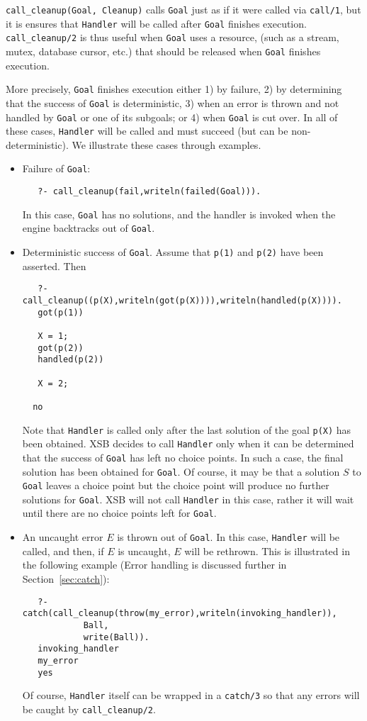 \begin{description}
\begin{itemize}
%
{\tt call\_cleanup(Goal, Cleanup)} calls {\tt Goal} just as if it were
called via {\tt call/1}, but it is ensures that {\tt Handler} will be
called after {\tt Goal} finishes execution.  {\tt call\_cleanup/2} is
thus useful when {\tt Goal} uses a resource, (such as a stream, mutex,
database cursor, etc.) that should be released when {\tt Goal}
finishes execution.

More precisely, {\tt Goal} finishes execution either 1) by failure, 2)
by determining that the success of {\tt Goal} is deterministic, 3)
when an error is thrown and not handled by {\tt Goal} or one of its
subgoals; or 4) when {\tt Goal} is cut over.  In all of these cases,
{\tt Handler} will be called and must succeed (but can be non-deterministic).
We illustrate these cases through examples.
\begin{itemize}
\item Failure of {\tt Goal}:
\begin{verbatim}
   ?- call_cleanup(fail,writeln(failed(Goal))).
\end{verbatim}
In this case, {\tt Goal} has no solutions, and the handler is invoked
when the engine backtracks out of {\tt Goal}.
%
\item Deterministic success of {\tt Goal}.  Assume that {\tt p(1)} and
  {\tt p(2)} have been asserted.  Then
\begin{verbatim}
   ?- call_cleanup((p(X),writeln(got(p(X)))),writeln(handled(p(X)))).
   got(p(1))

   X = 1;
   got(p(2))
   handled(p(2))

   X = 2;

  no
\end{verbatim}
Note that {\tt Handler} is called only after the last solution of the
goal {\tt p(X)} has been obtained.  XSB decides to call {\tt Handler}
only when it can be determined that the success of {\tt Goal} has left
no choice points.  In such a case, the final solution has been
obtained for {\tt Goal}.  Of course, it may be that a solution $S$ to
{\tt Goal} leaves a choice point but the choice point will produce no
further solutions for {\tt Goal}.  XSB will not call {\tt Handler} in
this case, rather it will wait until there are no choice points left
for {\tt Goal}.

\item An uncaught error $E$ is thrown out of {\tt Goal}.  In this
  case, {\tt Handler} will be called, and then, if $E$ is uncaught,
  $E$ will be rethrown.  This is illustrated in the following example
  (Error handling is discussed further in Section~\ref{sec:catch}):
\begin{verbatim}
   ?- catch(call_cleanup(throw(my_error),writeln(invoking_handler)),
            Ball,
            write(Ball)).
   invoking_handler
   my_error
   yes
\end{verbatim}
Of course, {\tt Handler} itself can be wrapped in a {\tt catch/3} so
that any errors will be caught by {\tt call\_cleanup/2}.


\end{itemize}
\end{itemize}
\end{description}
